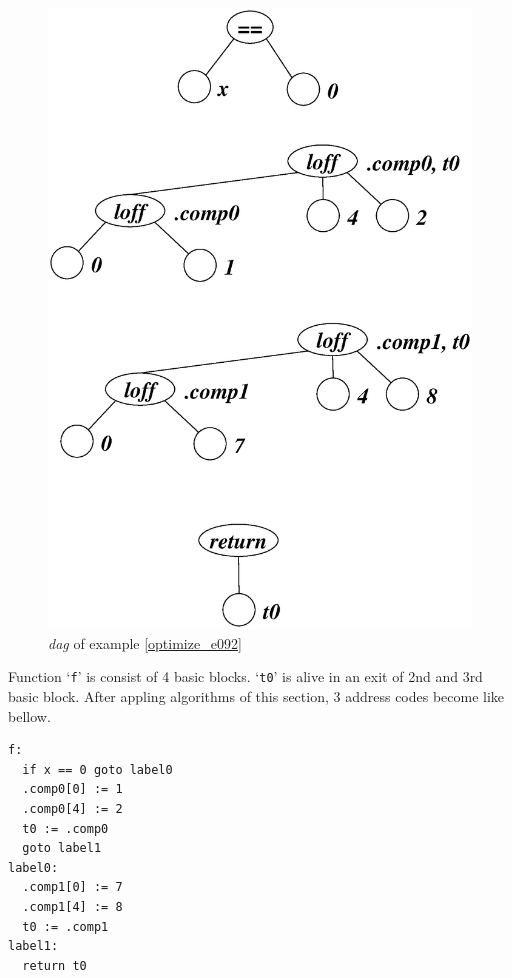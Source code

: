\begin{Example}
\begin{figure}[htbp]
\begin{center}
\begin{latexonly}
\includegraphics[width=1.0\linewidth,height=1.4\linewidth]{opt040.eps}
\end{latexonly}
\caption{{\em dag} of example \ref{optimize_e092}}
\label{optimize_e093}
\end{center}
\end{figure}
Function `{\tt{f}}' is consist of 4 basic blocks.
`{\tt{t0}}' is
alive in an exit of 2nd and 3rd basic block.
After appling algorithms of this section,
3 address codes become like bellow.
\begin{verbatim}
f:
  if x == 0 goto label0
  .comp0[0] := 1
  .comp0[4] := 2
  t0 := .comp0
  goto label1
label0:
  .comp1[0] := 7
  .comp1[4] := 8
  t0 := .comp1
label1:
  return t0
\end{verbatim}
\end{Example}

